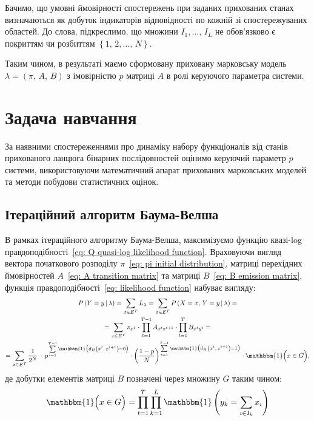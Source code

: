 Бачимо, що умовні ймовірності спостережень при заданих прихованих станах визначаються як добуток індикаторів відповідності по кожній зі спостережуваних областей. До слова, підкреслимо, що множини $I_1,\ldots,\,I_L$ не обов'язково є покриттям чи розбиттям $\left\{ 1,\,2,\ldots,\,N \right\}$.

Таким чином, в результаті маємо сформовану приховану марковську модель $\lambda=\left( \pi,\,A,\,B \right)$ з імовірністю $p$ матриці $A$ в ролі керуючого параметра системи. 

\section{Задача навчання}

За наявними спостереженнями про динаміку набору функціоналів від станів прихованого ланцюга бінарних послідовностей оцінимо керуючий параметр $p$ системи, використовуючи математичний апарат прихованих марковських моделей та методи побудови статистичних оцінок.

\subsection{Ітераційний алгоритм Баума-Велша}

В рамках ітераційного алгоритму Баума-Велша, максимізуємо функцію квазі-log правдоподібності~\eqref{eq: Q quasi-log likelihood function}. Враховуючи вигляд вектора початкового розподілу $\pi$~\eqref{eq: pi initial distribution}, матриці перехідних ймовірностей $A$~\eqref{eq: A transition matrix} та матриці $B$~\eqref{eq: B emission matrix}, функція правдоподібності~\eqref{eq: likelihood function} набуває вигляду:
\begin{gather*}
    P\left( Y=y \,|\, \lambda \right) = \sum\limits_{x \in E^T} L_{\lambda} = \sum\limits_{x \in E^T} P\left( X=x,\, Y=y \,|\, \lambda \right) = \\
    = \sum\limits_{x \in E^T} \pi_{x^1} \cdot \prod\limits_{t=1}^{T-1} A_{x^t x^{t+1}} \cdot \prod\limits_{t=1}^{T} B_{x^ty^t} = \\
    = \sum\limits_{x \in E^T} \frac{1}{2^N}\, \cdot\, p^{\sum\limits_{t=1}^{T-1} \mathbbm{1} \bigl( d_H\left( x^t,\,x^{t+1} \right) = 0 \bigr)} \cdot \left(\frac{1-p}{N}\right)^{\sum\limits_{t=1}^{T-1} \mathbbm{1} \bigl( d_H\left( x^t,\,x^{t+1} \right) = 1 \bigr)} \cdot \mathbbm{1} \Bigl( x \in G \Bigr),
\end{gather*}
де добутки елементів матриці $B$ позначені через множину $G$ таким чином: 
\begin{equation*}
    \mathbbm{1} \Bigl( x \in G \Bigr) = \prod\limits_{t=1}^{T} \prod\limits_{k=1}^{L} \mathbbm{1}\left( y_k=\sum\limits_{i \in I_k} x_i \right)
\end{equation*}

